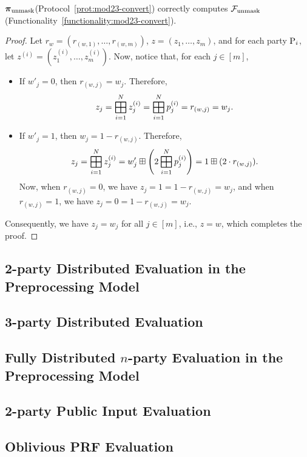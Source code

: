 \begin{lemma}
$\boldsymbol{\pi}_\textnormal{unmask}$(Protocol~\ref{prot:mod23-convert}) correctly computes $\mathcal{F}_{\textnormal{unmask}}$ (Functionality~\ref{functionality:mod23-convert}). 
\end{lemma}
\begin{proof}
Let $r_w = (r_{(w,1)}, \dots, r_{(w,m)})$, $z = (z_1, \dots, z_m)$, and for each party $\textnormal{P}_i$, let $z^{(i)} = (z^{(i)}_1, \dots, z^{(i)}_m)$. Now, notice that, for each $j \in [m]$,
\begin{itemize}
    \item If $w'_j = 0$, then $r_{(w,j)} = w_j$. Therefore,
    \[
     z_j = \bigboxplus_{i=1}^N z^{(i)}_j = \bigboxplus_{i=1}^N p^{(i)}_j = r_{(w,j)} = w_j.
    \]
    \item If $w'_j = 1$, then $w_j = 1 - r_{(w,j)}$. Therefore,
    \[
    z_j = \bigboxplus_{i=1}^N z^{(i)}_j = w'_j \boxplus \left(2\bigboxplus_{i=1}^N p^{(i)}_j \right) = 1 \boxplus (2 \cdot r_{(w,j)}).
    \]
    \noindent Now, when $r_{(w,j)} = 0$, we have $z_j = 1 = 1 - r_{(w,j)} = w_j$, and when $r_{(w,j)} = 1$, we have $z_j = 0 = 1 - r_{(w,j)} = w_j$.
\end{itemize}
Consequently, we have $z_j = w_j$ for all $j \in [m]$, i.e., $z = w$, which completes the proof.
\end{proof}

\subsection{2-party Distributed Evaluation in the Preprocessing Model}

\subsection{3-party Distributed Evaluation}

\subsection{Fully Distributed $n$-party Evaluation in the Preprocessing Model}

\subsection{2-party Public Input Evaluation}

\subsection{Oblivious PRF Evaluation}
